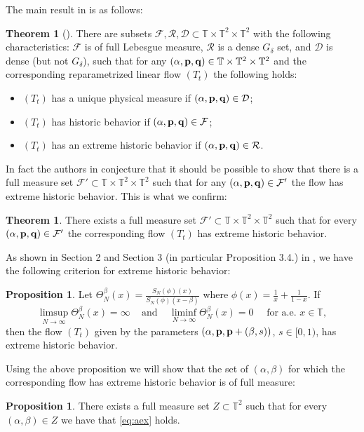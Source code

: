 \documentclass[11pt]{amsart}
\theoremstyle{definition}
\newtheorem{theorem}[definition]{Theorem}
\newtheorem{proposition}[definition]{Proposition}
\numberwithin{equation}{section}
\def\T{\mathbb{T}}
\begin{document}
The main result in \cite{An-Gu} is as follows: 
\begin{theorem}[{\cite[Theorem A]{An-Gu}}] There are subsets $\mathcal{F}, \mathcal{R},\mathcal{D}\subset  \T\times \T^2\times \T^2$ with the following characteristics: $\mathcal{F}$ is of full Lebesgue measure, $\mathcal{R}$ is a dense $G_\delta$ set, and $\mathcal{D}$ is dense (but not $G_\delta$), such that for any $(\alpha,{\bf p},{\bf q}) \in \T\times \T^2\times \T^2$ and the corresponding  reparametrized linear flow $(T_t)$ the following holds:
\begin{itemize}
\item $(T_t)$ has a unique physical measure if $(\alpha,{\bf p},{\bf q})\in \mathcal{D}$;
\item $(T_t)$ has historic behavior if $(\alpha,{\bf p},{\bf q})\in \mathcal{F}$;
\item $(T_t)$ has an extreme historic behavior if $(\alpha,{\bf p},{\bf q})\in \mathcal{R}$.
\end{itemize}
\end{theorem}
In fact the authors in \cite{An-Gu} conjecture that it should be possible to show that there is a full measure set $\mathcal{F}'\subset \T\times \T^2\times \T^2$ such that for any  $(\alpha,{\bf p},{\bf q})\in \mathcal{F}'$  the flow has extreme historic behavior. 
This is what we confirm:
\begin{theorem}\label{thm:conf} There exists a full measure set $\mathcal{F}'\subset \T\times \T^2\times \T^2$ such that for every $(\alpha,{\bf p},{\bf q})\in \mathcal{F}'$ the corresponding flow $(T_t)$ has extreme historic behavior.
\end{theorem}
 As shown in Section 2 and Section 3 (in particular Proposition 3.4.) in \cite{An-Gu}, 
we have the following criterion for extreme historic behavior:
\begin{proposition} 
Let $\Theta_N^\beta(x)=\frac{S_N(\phi)(x)}{S_N(\phi)(x-\beta)}$ where  $\phi(x)=\frac{1}{x}+\frac{1}{1-x}$. If
\begin{equation}\label{eq:aex}
\limsup_{N\to\infty}\Theta_N^\beta(x)=\infty\;\;\;\text{ and }\;\;\; \liminf_{N\to\infty}\Theta_N^\beta(x)=0\quad\text{ for a.e. } x\in \T,
\end{equation}
then the flow $(T_t)$ given by the parameters $(\alpha, {\bf p},{\bf p}+(\beta,s))$, $s\in [0,1)$, has extreme historic behavior. 
\end{proposition}

Using the above proposition we will show that the set of $(\alpha,\beta)$ for which the corresponding flow has extreme historic behavior is of full measure: 
\begin{proposition}\label{prop: full measure set} There exists a full measure set $Z\subset \T^2$ such that for every $(\alpha,\beta)\in Z$ we have that \eqref{eq:aex} holds.
\end{proposition}
\end{document}
